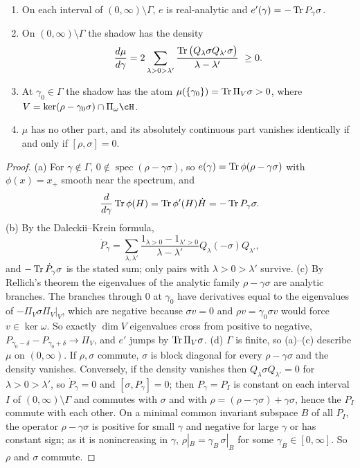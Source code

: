 \begin{theorem}[Structure]\label{shA:thm:structure}
\begin{enumerate}[label=(\alph*)]
\item On each interval of $(0,\infty)\setminus\Gamma$, $e$ is real-analytic and $e'(\gamma)=-\operatorname{Tr} P_\gamma\sigma$.
\item On $(0,\infty)\setminus\Gamma$ the shadow has the density
\[
\frac{d\mu}{d\gamma}=2\sum_{\lambda>0>\lambda'}\frac{\operatorname{Tr}\big(Q_\lambda\sigma Q_{\lambda'}\sigma\big)}{\lambda-\lambda'}\ \ge0 .
\]
\item At $\gamma_0\in\Gamma$ the shadow has the atom $\mu(\{\gamma_0\})=\operatorname{Tr}\Pi_{V}\sigma>0$, where $V=\ker(\rho-\gamma_0\sigma)\cap\Pi_\omega\cH$.
\item $\mu$ has no other part, and its absolutely continuous part vanishes identically if and only if $[\rho,\sigma]=0$.
\end{enumerate}
\end{theorem}

\begin{proof}
(a) For $\gamma\notin\Gamma$, $0\notin\operatorname{spec}(\rho-\gamma\sigma)$, so $e(\gamma)=\operatorname{Tr}\phi(\rho-\gamma\sigma)$ with $\phi(x)=x_+$ smooth near the spectrum, and
\[
\frac{d}{d\gamma}\operatorname{Tr}\phi(H)=\operatorname{Tr}\phi'(H)\dot H=-\operatorname{Tr} P_\gamma\sigma.
\]
(b) By the Daleckii--Krein formula,
\[
\dot P_\gamma=\sum_{\lambda,\lambda'}\frac{1_{\lambda>0}-1_{\lambda'>0}}{\lambda-\lambda'}Q_\lambda(-\sigma)Q_{\lambda'},
\]
and $-\operatorname{Tr}\dot P_\gamma\sigma$ is the stated sum; only pairs with $\lambda>0>\lambda'$ survive. (c) By Rellich's theorem the eigenvalues of the analytic family $\rho-\gamma\sigma$ are analytic branches. The branches through $0$ at $\gamma_0$ have derivatives equal to the eigenvalues of $-\Pi_V\sigma\Pi_V|_V$, which are negative because $\sigma v=0$ and $\rho v=\gamma_0\sigma v$ would force $v\in\ker\omega$. So exactly $\dim V$ eigenvalues cross from positive to negative, $P_{\gamma_0-\delta}-P_{\gamma_0+\delta}\to\Pi_V$, and $e'$ jumps by $\operatorname{Tr}\Pi_V\sigma$. (d) $\Gamma$ is finite, so (a)--(c) describe $\mu$ on $(0,\infty)$. If $\rho,\sigma$ commute, $\sigma$ is block diagonal for every $\rho-\gamma\sigma$ and the density vanishes. Conversely, if the density vanishes then $Q_\lambda\sigma Q_{\lambda'}=0$ for $\lambda>0>\lambda'$, so $\dot P_\gamma=0$ and $[\sigma,P_\gamma]=0$; then $P_\gamma=P_I$ is constant on each interval $I$ of $(0,\infty)\setminus\Gamma$ and commutes with $\sigma$ and with $\rho=(\rho-\gamma\sigma)+\gamma\sigma$, hence the $P_I$ commute with each other. On a minimal common invariant subspace $B$ of all $P_I$, the operator $\rho-\gamma\sigma$ is positive for small $\gamma$ and negative for large $\gamma$ or has constant sign; as it is nonincreasing in $\gamma$, $\rho|_B=\gamma_B\,\sigma|_B$ for some $\gamma_B\in[0,\infty]$. So $\rho$ and $\sigma$ commute.
\end{proof}

